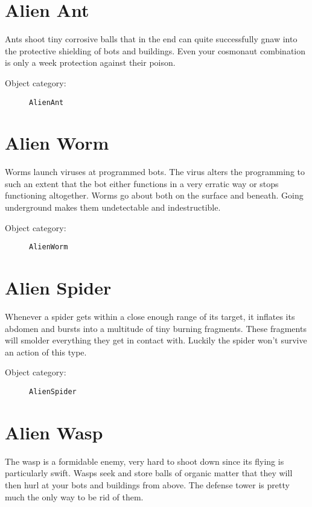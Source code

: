 \section{Alien Ant}

Ants shoot tiny corrosive balls that in the end can quite successfully gnaw into the protective shielding of bots and buildings. Even your cosmonaut combination is only a week protection against their poison.

\begin{description}
    \item[Object category:] \texttt{AlienAnt}
\end{description}


\section{Alien Worm}

Worms launch viruses at programmed bots.
The virus alters the programming to such an extent that the bot either functions in a very erratic way or stops functioning altogether.
Worms go about both on the surface and beneath. Going underground makes them undetectable and indestructible.
 
\begin{description}
    \item[Object category:] \texttt{AlienWorm}
\end{description}

\section{Alien Spider}

Whenever a spider gets within a close enough range of its target, it inflates its abdomen and bursts into a multitude of tiny burning fragments. These fragments will smolder everything they get in contact with. Luckily the spider won't survive an action of this type.

\begin{description}
    \item[Object category:] \texttt{AlienSpider}
\end{description}


\section{Alien Wasp}

The wasp is a formidable enemy, very hard to shoot down since its flying is particularly swift.
Wasps seek and store balls of organic matter that they will then hurl at your bots and buildings from above. The defense tower is pretty much the only way to be rid of them.

